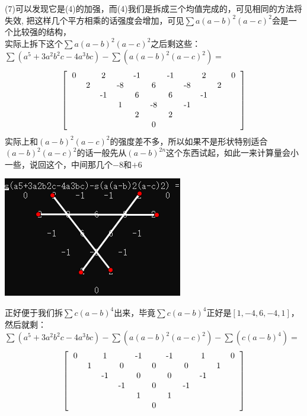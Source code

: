 \documentclass[UTF8]{ctexart}
\begin{document}
(7)可以发现它是(4)的加强，而(4)我们是拆成三个均值完成的，可见相同的方法将失效,
把这样几个平方相乘的话强度会增加，可见$\displaystyle \sum a(a-b)^{2}(a-c)^{2}$会是一个比较强的结构，\\
实际上拆下这个$\displaystyle \sum a(a-b)^{2}(a-c)^{2}$之后剩这些：\\
 $\displaystyle \sum (a^{5}+3a^{2}b^{2}c-4a^{3}bc)-\displaystyle \sum (a(a-b)^{2}(a-c)^{2})=$\\
 \renewcommand*{\arraystretch}{1.732}\[\left[\begin{matrix}
 	\begin{tabular}{ccccccccccccc}
 		0& &2& &-1& &-1& &2& &0\\
 		&2& &-8& &6& &-8& &2&\\
 		& &-1& &6& &6& &-1& &\\
 		& & &1& &-8& &-1& & &\\
 		& & & &2& &2& & & &\\
 		& & & & &0& & & & &\\
 	\end{tabular}
 \end{matrix}\right]\]
实际上和$ (a-b)^{2}(a-c)^{2} $的强度差不多，所以如果不是形状特别适合$ (a-b)^{2}(a-c)^{2} $的话一般先从$ (a-b)^{2n} $这个东西试起，如此一来计算量会小一些，说回这个，中间那几个$-8$和$+6$
  \begin{center}
  	\includegraphics[width=0.4\linewidth]{190}
  \end{center}
正好便于我们拆$\displaystyle \sum c(a-b)^4$出来，毕竟$\displaystyle \sum c(a-b)^4$正好是$[1,-4,6,-4,1]$，然后就剩：\\
  $ \displaystyle \sum (a^{5}+3a^{2}b^{2}c-4a^{3}bc)-\displaystyle \sum (a(a-b)^{2}(a-c)^{2})-\displaystyle \sum (c(a-b)^{4}) = $
  \renewcommand*{\arraystretch}{1.732}\[\left[\begin{matrix}
  	\begin{tabular}{ccccccccccccc}
  		0& &1& &-1& &-1& &1& &0\\
  		&1& &0& &0& &0& &1&\\
  		& &-1& &0& &0& &-1& &\\
  		& & &-1& &0& &-1& & &\\
  		& & & &1& &1& & & &\\
  		& & & & &0& & & & &\\
  	\end{tabular}
  \end{matrix}\right]\]
\end{document}

